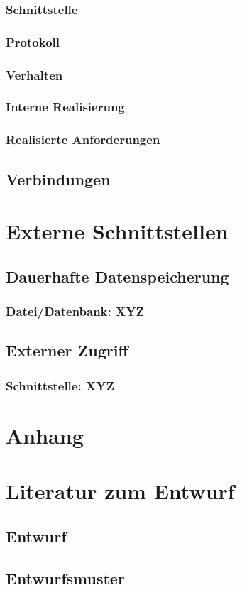 \documentclass[a4paper,12pt]{scrartcl}
\begin{document}
\subsubsection{Schnittstelle}
\subsubsection{Protokoll}
\subsubsection{Verhalten}
\subsubsection{Interne Realisierung}
\subsubsection{Realisierte Anforderungen}

\subsection{Verbindungen}

\section{Externe Schnittstellen}
\subsection{Dauerhafte Datenspeicherung}
\subsubsection{Datei/Datenbank: XYZ}
\subsection{Externer Zugriff}
\subsubsection{Schnittstelle: XYZ}

\appendix%

\section{Anhang}

\section{Literatur zum Entwurf}
\subsection{Entwurf}
\subsection{Entwurfsmuster}
\end{document}
